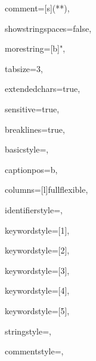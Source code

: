 {%
comment=[s]{(*}{*)},

showstringspaces=false,

morestring=[b]",

tabsize=3,							

extendedchars=true,  		 		

sensitive=true, 

breaklines=true,

basicstyle=\ttfamily,

captionpos=b,							

columns=[l]fullflexible,

identifierstyle={\ttfamily\color{black}},

keywordstyle=[1]{\ttfamily\color{dkviolet}},

keywordstyle=[2]{\ttfamily\color{dkgreen}},

keywordstyle=[3]{\ttfamily\color{lightblue}},

keywordstyle=[4]{\ttfamily\color{dkblue}},

keywordstyle=[5]{\ttfamily\color{red}},



stringstyle=\ttfamily,

commentstyle=\ttfamily\color{gray},

}

